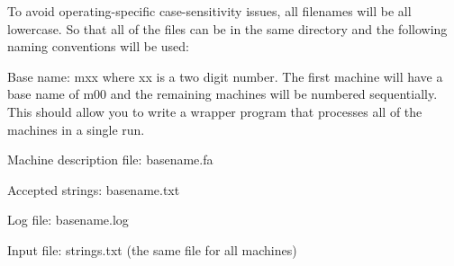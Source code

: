To avoid operating-\/specific case-\/sensitivity issues, all filenames will be all lowercase. So that all of the files can be in the same directory and the following naming conventions will be used\+:
\begin{DoxyItemize}
\item Base name\+: mxx where xx is a two digit number. The first machine will have a base name of m00 and the remaining machines will be numbered sequentially. This should allow you to write a wrapper program that processes all of the machines in a single run.
\item Machine description file\+: basename.\+fa
\item Accepted strings\+: basename.\+txt
\item Log file\+: basename.\+log
\item Input file\+: strings.\+txt (the same file for all machines) 
\end{DoxyItemize}
